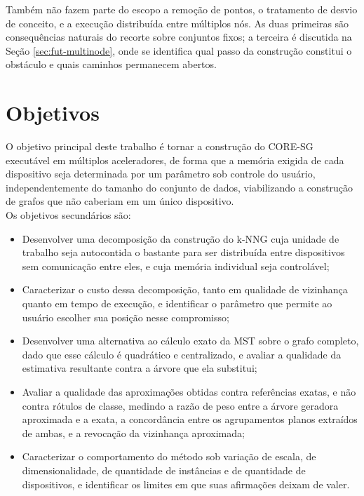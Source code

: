 Também não fazem parte do escopo a remoção de pontos, o tratamento de desvio de conceito, e a execução distribuída entre múltiplos nós. As duas primeiras são consequências naturais do recorte sobre conjuntos fixos; a terceira é discutida na Seção \ref{sec:fut-multinode}, onde se identifica qual passo da construção constitui o obstáculo e quais caminhos permanecem abertos.\\

\section{Objetivos\label{sec:objectives}}

O objetivo principal deste trabalho é tornar a construção do \ac{CORE-SG} executável em múltiplos aceleradores, de forma que a memória exigida de cada dispositivo seja determinada por um parâmetro sob controle do usuário, independentemente do tamanho do conjunto de dados, viabilizando a construção de grafos que não caberiam em um único dispositivo.\\

Os objetivos secundários são:
\begin{itemize}
    \item Desenvolver uma decomposição da construção do \ac{k-NNG} cuja unidade de trabalho seja autocontida o bastante para ser distribuída entre dispositivos sem comunicação entre eles, e cuja memória individual seja controlável;

    \item Caracterizar o custo dessa decomposição, tanto em qualidade de vizinhança quanto em tempo de execução, e identificar o parâmetro que permite ao usuário escolher sua posição nesse compromisso;

    \item Desenvolver uma alternativa ao cálculo exato da \ac{MST} sobre o grafo completo, dado que esse cálculo é quadrático e centralizado, e avaliar a qualidade da estimativa resultante contra a árvore que ela substitui;

    \item Avaliar a qualidade das aproximações obtidas contra referências exatas, e não contra rótulos de classe, medindo a razão de peso entre a árvore geradora aproximada e a exata, a concordância entre os agrupamentos planos extraídos de ambas, e a revocação da vizinhança aproximada;

    \item Caracterizar o comportamento do método sob variação de escala, de dimensionalidade, de quantidade de instâncias e de quantidade de dispositivos, e identificar os limites em que suas afirmações deixam de valer.
\end{itemize}

